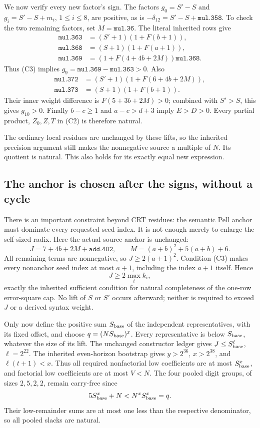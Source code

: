 We now verify every new factor's sign. The factors \(g_0=S'-S\) and
\(g_i=S'-S+m_i\), \(1\le i\le8\), are positive, as is
\(-\delta_{12}=S'-S+\texttt{mul.358}\). To check the two remaining
factors, set \(M=\texttt{mul.36}\). The literal inherited rows give
\begin{align*}
 \texttt{mul.363}&=(S'+1)(1+F(b+1)),\\
 \texttt{mul.368}&=(S+1)(1+F(a+1)),\\
 \texttt{mul.369}&=(1+F(4+4b+2M))\texttt{mul.368}.
\end{align*}
Thus (C3) implies \(g_9=\texttt{mul.369}-\texttt{mul.363}>0\).
Also
\begin{align*}
 \texttt{mul.372}&=(S'+1)(1+F(6+4b+2M)),\\
 \texttt{mul.373}&=(S+1)(1+F(b+1)).
\end{align*}
Their inner weight difference is \(F(5+3b+2M)>0\); combined with
\(S'>S\), this gives \(g_{10}>0\). Finally \(b-c\ge1\) and
\(a-c>d+3\) imply \(E>D>0\). Every partial product, \(Z_0,Z,T\)
in (C2) is therefore natural.

The ordinary local residues are unchanged by these lifts, so the inherited
precision argument still makes the nonnegative source a multiple of \(N\).
Its quotient is natural. This also holds for its exactly equal new expression.

\subsection{The anchor is chosen after the signs, without a cycle}

There is an important constraint beyond CRT residues: the semantic Pell
anchor must dominate every requested seed index. It is not enough merely
to enlarge the self-sized radix. Here the actual source anchor is unchanged:
\[
 J=7+4b+2M+\texttt{add.402},\qquad
 M=(a+b)^2+5(a+b)+6.
\]
All remaining terms are nonnegative, so
\(J\ge2(a+1)^2\). Condition (C3) makes every nonanchor seed index at
most \(a+1\), including the index \(a+1\) itself. Hence
\[
 J\ge2\max_i k_i,
\]
exactly the inherited sufficient condition for natural completeness of the
one-row error-square cap. No lift of \(S\) or \(S'\) occurs afterward;
neither is required to exceed \(J\) or a derived syntax weight.

Only now define the positive sum \(S_{\rm base}\) of the independent
representatives, with its fixed offset, and choose
\(q=(NS_{\rm base})^x\). Every representative is below \(S_{\rm base}\),
whatever the size of its lift. The unchanged constructor ledger gives
\(J\le S_{\rm base}^{\ell}\), \(\ell=2^{22}\). The inherited even-horizon
bootstrap gives \(y>2^{36}\), \(x>2^{38}\), and \(\ell(t+1)<x\).
Thus all required nonfactorial low coefficients are at most
\(S_{\rm base}^x\), and factorial low coefficients are at most \(V<N\).
The four pooled digit groups, of sizes \(2,5,2,2\), remain carry-free since
\[
 5S_{\rm base}^x+N<N^xS_{\rm base}^x=q.
\]
Their low-remainder sums are at most one less than the respective denominator,
so all pooled slacks are natural.

